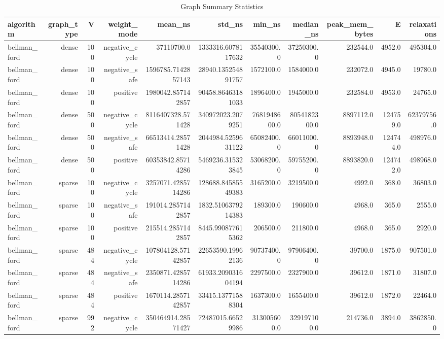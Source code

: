\begin{table}[htbp]
\centering
\caption{Graph Summary Statistics}
\label{tab:graph_summary}
\begin{tabular}{lrrrrrrrrrr}
\hline
algorithm & graph_type & V & weight_mode & mean_ns & std_ns & min_ns & median_ns & peak_mem_bytes & E & relaxations \\
\hline
bellman_ford & dense & 100 & negative_cycle & 37110700.0 & 1333316.6078117632 & 35540300.0 & 37250300.0 & 232544.0 & 4952.0 & 495304.0 \\
bellman_ford & dense & 100 & negative_safe & 1596785.7142857143 & 28940.135254891757 & 1572100.0 & 1584000.0 & 232072.0 & 4945.0 & 19780.0 \\
bellman_ford & dense & 100 & positive & 1980042.857142857 & 90458.86463181033 & 1896400.0 & 1945000.0 & 232584.0 & 4953.0 & 24765.0 \\
bellman_ford & dense & 500 & negative_cycle & 8116407328.571428 & 340972023.2079251 & 7681948600.0 & 8054182300.0 & 8897112.0 & 124759.0 & 62379756.0 \\
bellman_ford & dense & 500 & negative_safe & 66513414.28571428 & 2044984.5259631122 & 65082400.0 & 66011000.0 & 8893948.0 & 124744.0 & 498976.0 \\
bellman_ford & dense & 500 & positive & 60353842.85714286 & 5469236.315323845 & 53068200.0 & 59755200.0 & 8893820.0 & 124742.0 & 498968.0 \\
bellman_ford & sparse & 100 & negative_cycle & 3257071.4285714286 & 128688.84585549383 & 3165200.0 & 3219500.0 & 4992.0 & 368.0 & 36803.0 \\
bellman_ford & sparse & 100 & negative_safe & 191014.2857142857 & 1832.5106379214383 & 189300.0 & 190600.0 & 4968.0 & 365.0 & 2555.0 \\
bellman_ford & sparse & 100 & positive & 215514.2857142857 & 8445.990877615362 & 206500.0 & 211800.0 & 4968.0 & 365.0 & 2920.0 \\
bellman_ford & sparse & 484 & negative_cycle & 107804128.57142857 & 22653590.19962136 & 90737400.0 & 97906400.0 & 39700.0 & 1875.0 & 907501.0 \\
bellman_ford & sparse & 484 & negative_safe & 2350871.4285714286 & 61933.209031604194 & 2297500.0 & 2327900.0 & 39612.0 & 1871.0 & 31807.0 \\
bellman_ford & sparse & 484 & positive & 1670114.2857142857 & 33415.13771588304 & 1637300.0 & 1655400.0 & 39612.0 & 1872.0 & 22464.0 \\
bellman_ford & sparse & 992 & negative_cycle & 350464914.28571427 & 72487015.66529986 & 313005600.0 & 329197100.0 & 214736.0 & 3894.0 & 3862850.0 \\

\end{tabular}
\end{table}
